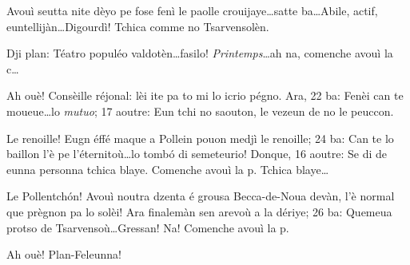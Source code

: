 


\DramPer


 

\begin{drama}

\Laurentspeaks Avouì seutta nite dèyo pe fose fenì le paolle crouijaye\ldots satte ba\ldots \og Abile, actif, euntellijàn\fg\ldots Digourdì! Tchica comme no Tsarvensolèn.


\Laurentspeaks Dji plan: \og Téatro populéo valdotèn\fg\ldots fasilo! \textit{Printemps}\ldots ah na, comenche avouì la c\ldots


\Laurentspeaks Ah ouè! \og Consèille réjonal\fg: lèi ite pa to mi lo icrio pégno. Ara, 22 ba: \og Fenèi can te moueue\ldots lo \textit{mutuo}; 17 aoutre: \og Eun tchi no saouton, le vezeun de no le peuccon\fg.


\Laurentspeaks Le renoille! Eugn éffé maque a Pollein pouon medjì le renoille; 24 ba: \og Can te lo baillon l'è pe l'éternitoù\fg\ldots lo tomb\'o di semeteurio! Donque, 16 aoutre: \og Se di de eunna personna tchica blaye\fg. Comenche avouì la p. Tchica blaye\ldots


\Laurentspeaks Le Pollentch\'on! Avouì noutra dzenta é grousa Becca-de-Noua devàn, l'è normal que prègnon pa lo solèi! Ara finalemàn sen arevoù a la dériye; 26 ba: \og Quemeua protso de Tsarvensoù\fg\ldots Gressan! Na! Comenche avouì la p.


\Laurentspeaks Ah ouè! Plan-Feleunna!



\end{drama}
